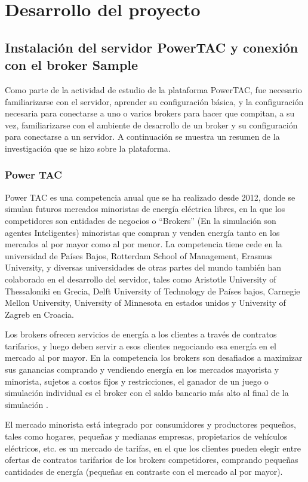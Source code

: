 \chapter{Desarrollo del proyecto}
\section{Instalación del servidor PowerTAC y conexión con el broker Sample}

Como parte de la actividad de estudio de la plataforma PowerTAC, fue necesario familiarizarse con el servidor, aprender su configuración básica, y la configuración necesaria para conectarse a uno o varios brokers para hacer que compitan, a su vez, familiarizarse con el ambiente de desarrollo de un broker y su configuración para conectarse a un servidor. A continuación se muestra un resumen de la investigación que se hizo sobre la plataforma.
\subsection{Power TAC}

Power TAC es una competencia anual que se ha realizado desde 2012, donde se simulan futuros mercados minoristas de energía eléctrica libres, en la que los competidores son entidades de negocios o ``Brokers'' (En la simulación son agentes Inteligentes) minoristas que compran y venden energía tanto en los mercados al por mayor como al por menor. La competencia tiene cede en la universidad de Países Bajos, Rotterdam School of Management, Erasmus University, y diversas universidades de otras partes del mundo también han colaborado en el desarrollo del servidor, tales como Aristotle University of Thessaloniki en Grecia, Delft University of Technology de Países bajos, Carnegie Mellon University, University of Minnesota en estados unidos y University of Zagreb en Croacia.

Los brokers ofrecen servicios de energía a los clientes a través de contratos tarifarios, y luego deben servir a esos clientes negociando esa energía en el mercado al por mayor. En la competencia los brokers son desafiados a maximizar sus ganancias comprando y vendiendo energía en los mercados mayorista y minorista, sujetos a costos fijos y restricciones, el ganador de un juego o simulación individual es el broker con el saldo bancario más alto al final de la simulación \cite{WKetterJCollinsyMdWeerdtThe2017PowerTAC}.

El mercado minorista está integrado por consumidores y productores pequeños, tales como hogares, pequeñas y medianas empresas, propietarios de vehículos eléctricos, etc. es un mercado de tarifas, en el que los clientes pueden elegir entre ofertas de contratos tarifarios de los brokers competidores, comprando pequeñas cantidades de energía (pequeñas en contraste con el mercado al por mayor).

